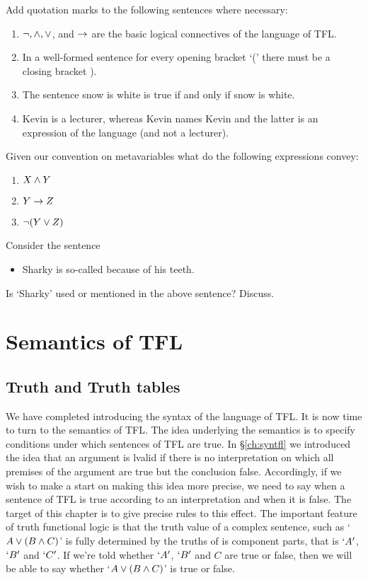 \begin{practiceproblems}
\problempart
Add quotation marks to the following sentences where necessary:
\begin{enumerate}
\item $\neg,\mathbin{\wedge},\vee$, and $\rightarrow$ are the basic logical connectives of the language of TFL.
\item In a well-formed sentence for every opening bracket `(' there must be a closing bracket ).
\item The sentence snow is white is true if and only if snow is white. 
\item Kevin is a lecturer, whereas Kevin names Kevin and the latter is an expression of the language (and not a lecturer).
\end{enumerate}

\problempart
Given our convention on metavariables what do the following expressions convey:
\begin{enumerate}
\item $X\wedge Y$
\item $Y\rightarrow Z$
\item $\neg(Y\vee Z)$
\end{enumerate}

\problempart
Consider the sentence
\begin{itemize}
\item Sharky is so-called because of his teeth.
\end{itemize}
Is `Sharky' used or mentioned in the above sentence? Discuss.
\end{practiceproblems}


\chapter{Semantics of TFL}
\section{Truth and Truth tables}\label{sec:tt}
We have completed introducing the syntax of the language of TFL. It is now time to turn to the semantics of TFL. The idea underlying the semantics is to specify conditions under which sentences of TFL are true. In \S\ref{ch:syntfl} we introduced the idea that an argument is lvalid if there is no interpretation on which all premises of the argument are true but the conclusion false. Accordingly, if we wish to make a start on making this idea more precise, we need to say when a sentence of TFL is true according to an interpretation and when it is false. The target of this chapter is to give precise rules to this effect. The important feature of truth functional logic is that the truth value of a complex sentence, such as `$A\vee(B\mathbin{\wedge} C)$' is fully determined by the truths of is component parts, that is $`A'$, $`B'$ and $`C'$. If we're told whether $`A'$, $`B'$ and $C$ are true or false, then we will be able to say whether `$A\vee(B\mathbin{\wedge} C)$' is true or false.

